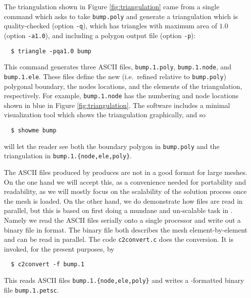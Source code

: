 The triangulation shown in Figure \ref{fig:triangulation} came from a single command which asks \Triangle to take \texttt{bump.poly} and generate a triangulation which is quality-checked \citep{Shewchuk1996} (option \texttt{-q}), which has triangles with maximum area of $1.0$ (option \texttt{-a1.0}), and including a polygon output file (option \texttt{-p}):
\begin{verbatim}
  $ triangle -pqa1.0 bump
\end{verbatim}
This command generates three ASCII files, \texttt{bump.1.poly}, \texttt{bump.1.node}, and  \texttt{bump.1.ele}.  These files define the new (i.e.~refined relative to \texttt{bump.poly}) polygonal boundary, the nodes locations, and the elements of the triangulation, respectively.  For example, \texttt{bump.1.node} has the numbering and node locations shown in blue in Figure \ref{fig:triangulation}.  The \Triangle software includes a minimal visualization tool which shows the triangulation graphically, and so
\begin{verbatim}
  $ showme bump
\end{verbatim}
will let the reader see both the boundary polygon in \texttt{bump.poly} and the triangulation in \texttt{bump.1.\{node,ele,poly\}}.

\begin{figure*}

\caption{A FEM triangulation generated by \Triangle.  {\color{blue} Nodes} are labeled by $j=0,\dots,N-1$ with $N=24$ and {\color{red} elements} are labeled by $k=0,\dots,K-1$ with $K=32$.}
\label{fig:triangulation}
\end{figure*}

The ASCII files produced by \Triangle produces are not in a good format for large meshes.  On the one hand we will accept this, as a convenience needed for portability and readability, as we will mostly focus on the scalability of the solution process once the mesh is loaded.  On the other hand, we do demonstrate how files are read in parallel, but this is based on first doing a mundane and un-scalable task in \PETSc.  Namely we read the ASCII \Triangle files serially onto a single processor and write out a binary file in \PETSc format.  The binary file both describes the mesh element-by-element and can be read in parallel.  The code \texttt{c2convert.c} does the conversion.  It is invoked, for the present purposes, by
\begin{verbatim}
  $ c2convert -f bump.1
\end{verbatim}
This reads ASCII files \texttt{bump.1.\{node,ele,poly\}} and writes a \PETSc-formatted binary file \texttt{bump.1.petsc}.


